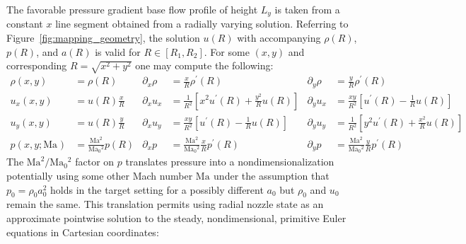 \documentclass[letterpaper,11pt,nointlimits,reqno]{amsart}
\newcommand{\Mach}[1][]{\mbox{Ma}_{#1}}
\begin{document}
The favorable pressure gradient base flow profile of height $L_y$ is taken from
a constant $x$ line segment obtained from a radially varying solution.
Referring to Figure~\eqref{fig:mapping_geometry}, the solution
$u\!\left(R\right)$ with accompanying $\rho\!\left(R\right)$,
$p\!\left(R\right)$, and $a\!\left(R\right)$ is valid for
$R\in\left[R_1,R_2\right]$.  For some $\left(x,y\right)$ and corresponding
$R=\sqrt{x^2+y^2}$ one may compute the following:
%
\begin{align}
              \rho \!\left(x, y\right)        &= \rho\!\left(R\right)
 & \partial_x \rho                            &= \frac{x}{R} \rho^\prime\!\left(R\right)
 & \partial_y \rho                            &= \frac{y}{R} \rho^\prime\!\left(R\right)
\\            u_x  \!\left(x, y\right)        &= u   \!\left(R\right) \frac{x}{R}
 & \partial_x u_x                             &= \frac{1}{R^2}\left[x^2 u^\prime\!\left(R\right) + \frac{y^2}{R} u\!\left(R\right)\right]
 & \partial_y u_x                             &= \frac{xy}{R^2}\left[u^\prime\!\left(R\right) - \frac{1}{R}u\!\left(R\right)\right]
\\            u_y  \!\left(x, y\right)        &= u   \!\left(R\right) \frac{y}{R}
 & \partial_x u_y                             &= \frac{xy}{R^2}\left[u^\prime\!\left(R\right) - \frac{1}{R}u\!\left(R\right)\right]
 & \partial_y u_y                             &= \frac{1}{R^2}\left[y^2 u^\prime\!\left(R\right) + \frac{x^2}{R} u\!\left(R\right)\right]
\\            p    \!\left(x, y; \Mach\right) &= \frac{\Mach^2}{\Mach[0]{}^2} p   \!\left(R\right)
 & \partial_x p                               &= \frac{\Mach^2}{\Mach[0]{}^2}\frac{x}{R} p^\prime\!\left(R\right)
 & \partial_y p                               &= \frac{\Mach^2}{\Mach[0]{}^2}\frac{y}{R} p^\prime\!\left(R\right)
\end{align}
The $\Mach^2/\Mach[0]{}^2$ factor on $p$ translates pressure into a
nondimensionalization potentially using some other Mach number $\Mach$ under
the assumption that $p_0 = \rho_0 a_0^2$ holds in the target setting for a
possibly different $a_0$ but $\rho_0$ and $u_0$ remain the same.  This
translation permits using radial nozzle state as an approximate pointwise
solution to the steady, nondimensional, primitive Euler equations in Cartesian
coordinates:
\end{document}
